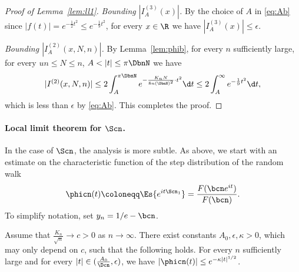 \begin{proof}[Proof of Lemma~\ref{lem:ll1}]
\emph{Bounding $|I^{(3)}_{A}(x)|$.} By the choice of $A$ in \eqref{eq:Ab}
since $|f(t)|=e^{-  \frac{1}{2} t^{2}} \le e^{-  \frac{1}{9} t^{2}}$,
for every $x \in \R$ we have $|I^{(3)}_{A}(x)| \leq \epsilon$.


 \emph{Bounding $|I^{(2)}_{{A} }(x,N,n)|$.}  By Lemma~\ref{lem:phib},  for every $n$ sufficiently large, for every $ un \leq N \leq n$, $A<|t| \leq \pi  \DbnN$ we have
\[|I^{(2)}(x,N,n)| \leq 2 \int_{A}^{\pi \DbnN} e^{-  \frac{ K_{n} N }{ 8 n (\DbnN)^{2}} \cdot t^{2} } {\d}t \leq 2 \int_{A}^{\infty } e^{-  \frac{1}{9} t^{2}} {\d}t,\]
   which is less than $\epsilon$ by \eqref{eq:Ab}. This completes the proof.
\end{proof}





\paragraph*{Local limit theorem for $\Scn$.}

In the case of $\Scn$, the analysis is more subtle.
As above, we start with an estimate on the characteristic function
of the step distribution of the random walk
\[\phicn(t)\coloneqq\Es{e^{it\Scn_{1}}}=\frac{F( \bcn e^{it})}{F(\bcn)}.\]
To simplify notation, set  $y_{n}=1/e-\bcn$.

\begin{lemma}\label{lem:technique}
Assume that $\tfrac{K_{n}}{\sqrt{n}} \rightarrow c>0$ as $n \rightarrow \infty$.  There exist constants $A_{0},\epsilon,\kappa>0$, which may only depend on $c$, such that the following holds.
For every $n$ sufficiently large and for every $|t| \in (\frac{A_{0}}{\Dcn},\epsilon)$, we have $|\phicn(t)| \leq e^{- \kappa |t|^{1/2}}$.
\end{lemma}



